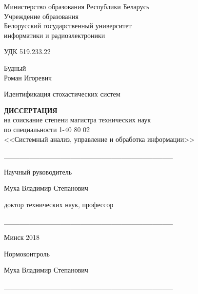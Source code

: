 \setlength{\parindent}{0mm} %
{\centering
  Министерство образования Республики Беларусь \\
  Учреждение образования \\
  Белорусский государственный университет \\
  информатики и радиоэлектроники \\
}

\vspace{2\baselineskip}
УДК 519.233.22

\vspace{\baselineskip}
{\centering
  Будный \\ Роман Игоревич

  \vspace{5\baselineskip}
  Идентификация стохастических систем

  \bigskip
  \textbf{ДИССЕРТАЦИЯ} \\
  на соискание степени магистра технических наук \\
  по специальности 1-40 80 02 \\
  <<Системный анализ, управление и обработка информации>> \\
}

\vspace{2\baselineskip}
\begin{minipage}{.45\linewidth}
\end{minipage}
\hfill
\begin{minipage}{.5\linewidth}
  \_\_\_\_\_\_\_\_\_\_\_\_\_\_\_\_\_\_\_\_\_\_\_\_\_\_\_\_\_\_\_\_\_

  \vspace{1.5\baselineskip}
  Научный руководитель

  \smallskip
  Муха Владимир Степанович

  \smallskip
  доктор технических наук, профессор

  \bigskip
  \_\_\_\_\_\_\_\_\_\_\_\_\_\_\_\_\_\_\_\_\_\_\_\_\_\_\_\_\_\_\_\_\_
\end{minipage}

\vfill
{\centering Минск 2018 \\}
\thispagestyle{empty}
\pagebreak

\vspace*{18cm}
Нормоконтроль

\smallskip
Муха Владимир Степанович

\bigskip
\_\_\_\_\_\_\_\_\_\_\_\_\_\_\_\_\_\_\_\_\_\_\_\_\_\_\_\_\_\_\_\_\_

\thispagestyle{empty}
\pagebreak
\setlength{\parindent}{1.25cm} %
